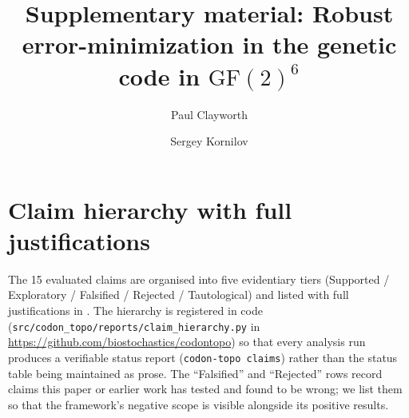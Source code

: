 \documentclass[preprint,11pt,authoryear,a4paper]{elsarticle}
\begin{document}
\begin{frontmatter}
\title{Supplementary material: Robust error-minimization in the genetic code in $\mathrm{GF}(2)^6$}
\author[lc]{Paul Clayworth}
\author[bs]{Sergey Kornilov}
\end{frontmatter}

\section{Claim hierarchy with full justifications}\label{sec:s-claims}

The 15 evaluated claims are organised into five evidentiary tiers
(Supported / Exploratory / Falsified / Rejected / Tautological) and
listed with full justifications in . The hierarchy
is registered in code
(\texttt{src/codon\_topo/reports/claim\_hierarchy.py} in
\url{https://github.com/biostochastics/codontopo}) so that every
analysis run produces a verifiable status report
(\texttt{codon-topo\ claims}) rather than the status table being
maintained as prose. The ``Falsified'' and ``Rejected'' rows record
claims this paper or earlier work has tested and found to be wrong; we
list them so that the framework's negative scope is visible alongside
its positive results.
\end{document}
